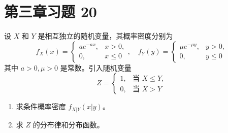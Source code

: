\documentclass[twoside]{article}
\begin{document}
\maketitle
\vspace{-3.5em}

\tableofcontents

\section{第三章习题 20}

设 $X$ 和 $Y$ 是相互独立的随机变量，其概率密度分别为
\[
f_X(x) = 
\begin{cases} 
ae^{-ax}, & x > 0, \\ 
0, & x \leq 0 
\end{cases}, \quad 
f_Y(y) = 
\begin{cases} 
\mu e^{-\mu y}, & y > 0, \\ 
0, & y \leq 0 
\end{cases}
\]
其中 $a > 0, \mu > 0$ 是常数。引入随机变量
\[
Z = 
\begin{cases} 
1, & \text{当 } X \leq Y, \\ 
0, & \text{当 } X > Y 
\end{cases}
\]

\begin{enumerate}
    \item 求条件概率密度 $f_{X|Y}(x|y)$。
    \item 求 $Z$ 的分布律和分布函数。
\end{enumerate}
\end{document}
